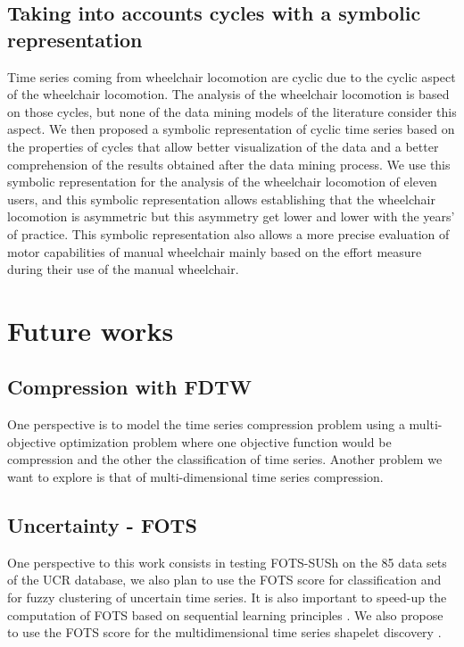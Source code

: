 \subsection*{Taking into accounts cycles with a symbolic representation}
Time series coming from wheelchair locomotion are cyclic due to the cyclic aspect of the wheelchair locomotion. The analysis of the wheelchair locomotion is based on those cycles, but none of the data mining models of the literature consider this aspect. We then proposed a symbolic representation of cyclic time series based on the properties of cycles that allow better visualization of the data and a better comprehension of the results obtained after the data mining process. We use this symbolic representation for the analysis of the wheelchair locomotion of eleven users, and this symbolic representation allows establishing that the wheelchair locomotion is asymmetric but this asymmetry get lower and lower with the years' of practice. This symbolic representation also allows a more precise evaluation of motor capabilities of manual wheelchair mainly based on the effort measure during their use of the manual wheelchair.
\section*{Future works}

\subsection*{Compression with FDTW}
One perspective is to model the time series compression problem using a multi-objective optimization problem where one objective function would be compression and the other the classification of time series. Another problem we want to explore is that of multi-dimensional time series compression.


\subsection*{Uncertainty - FOTS}
One perspective to this work consists in testing FOTS-SUSh on the 85 data sets of the UCR database, we also plan to  use the FOTS score for classification and for fuzzy clustering of uncertain time series.  It is also important to speed-up the computation of FOTS based on sequential learning principles  \cite{calandriello}. We also propose to use the FOTS score for the multidimensional time series shapelet discovery \cite{zeitouniselect}.  


